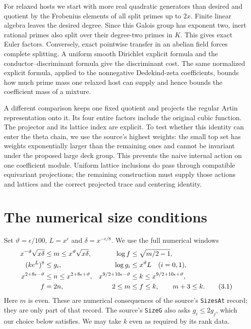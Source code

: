 \documentclass[11pt]{article}
\theoremstyle{remark}\newtheorem{remark}[theorem]{Remark}
\begin{document}
For relaxed hosts we start with more real quadratic generators than
desired and quotient by the Frobenius elements of all split primes
up to $2x$. Finite linear algebra leaves the desired degree. Since
this Galois group has exponent two, inert rational primes also split
over their degree-two primes in $K$. This gives exact Euler factors.
Conversely, exact pointwise transfer in an abelian field forces
complete splitting. A uniform smooth Dirichlet explicit formula and
the conductor--discriminant formula give the discriminant cost.
The same normalized explicit formula, applied to the nonnegative
Dedekind-zeta coefficients, bounds how much prime mass one relaxed
host can supply and hence bounds the coefficient mass of a mixture.

A different comparison keeps one fixed quotient and projects the
regular Artin representation onto it. Its four entire factors include
the original cubic function. The projector and its lattice index are
explicit. To test whether this identity can enter the theta
chain, we use the source's highest weights: the small top set has
weights exponentially larger than the remaining ones and cannot be
invariant under the proposed large deck group. This prevents the
naive internal action on one coefficient module. Uniform lattice
inclusions do pass through compatible equivariant projections; the
remaining construction must supply those actions and lattices and the
correct projected trace and centering identity.



\section{The numerical size conditions}

Set $\vartheta=\epsilon/100$, $L=x^\epsilon$ and
$\delta=x^{-\epsilon/8}$. We use the full numerical windows
\begin{align}
 x^{-\vartheta}\sqrt{x\delta}&\le m\le
            x^\vartheta\sqrt{x\delta},&
 \log f&\le\sqrt{m/2-1},\notag\\
 (ke^L)^8&\le g_i,&\log g_i&\le x^\vartheta L\quad(i=0,1),\notag\\
 x^{2+8\epsilon-\vartheta}&\le n\le x^{2+8\epsilon+\vartheta},&
 x^{9/2+10\epsilon-\vartheta}&\le k\le
                         x^{9/2+10\epsilon+\vartheta},\notag\\
 f&=2n,& 2\le m&\le f\le k,\qquad m+3\le k.
                                                        \tag{3.1}
\end{align}
Here $m$ is even. These are numerical consequences of the source's
\texttt{SizesAt} record; they are only part of that record. The
source's \texttt{SizeG} also asks $g_i\le2g_j$, which our choice
below satisfies. We may take $k$ even as required by its rank data.
\end{document}
